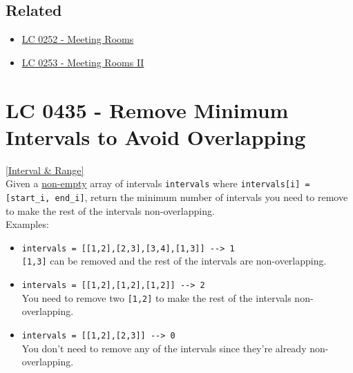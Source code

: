 \subsection*{Related}
\begin{itemize}
\item \hyperref[lc0252]{LC 0252 - Meeting Rooms}
\item \hyperref[lc0253]{LC 0253 - Meeting Rooms II}
\end{itemize}

\section{LC 0435 - Remove Minimum Intervals to Avoid Overlapping}\label{lc0435}
\hyperref[sec:interval_range]{[Interval \& Range]}\\

Given a \ul{non-empty} array of intervals {\colorbox{CodeBackground}{\lstinline|intervals|}} where {\colorbox{CodeBackground}{\lstinline|intervals[i] = [start_i, end_i]|}}, return the minimum number of intervals you need to remove to make the rest of the intervals non-overlapping.\\

Examples:
\begin{itemize}
\item {\colorbox{CodeBackground}{\lstinline|intervals = [[1,2],[2,3],[3,4],[1,3]] --> 1|}}\\
{\colorbox{CodeBackground}{\lstinline|[1,3]|}} can be removed and the rest of the intervals are non-overlapping.
\item {\colorbox{CodeBackground}{\lstinline|intervals = [[1,2],[1,2],[1,2]] --> 2|}}\\
You need to remove two {\colorbox{CodeBackground}{\lstinline|[1,2]|}} to make the rest of the intervals non-overlapping.
\item {\colorbox{CodeBackground}{\lstinline|intervals = [[1,2],[2,3]] --> 0|}}\\
You don't need to remove any of the intervals since they're already non-overlapping.
\end{itemize}

